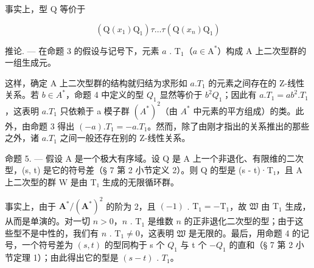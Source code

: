   事实上，型 Q 等价于

\[
(\mathrm{Q} (x _ {1}) \mathrm{Q} _ {1}) \tau \dots \tau (\mathrm{Q} (x _ {n}) \mathrm{Q} _ {1})
\]

推论. --- 在命题 3 的假设与记号下，元素 \(a\) . \(\mathrm{T}_{1}\)（\(a \in \mathrm{A}^{*}\)）构成 A 上二次型群的一组生成元。

  这样，确定 A 上二次型群的结构就归结为求形如 \(a.T_{1}\) 的元素之间存在的 Z-线性关系。若 \(b \in A^{*}\)，命题 4 中定义的型 \(Q_{1}\) 显然等价于 \(b^{2}Q_{1}\)；因此有 \(a.T_{1} = ab^{2}.T_{1}\)，这表明 \(a.T_{1}\) 只依赖于 a 模子群 \((A^{*})^{2}\)（由 \(A^{*}\) 中元素的平方组成）的类。此外，由命题 3 得出 \((-a).T_{1} = -a.T_{1}\)。然而，除了由刚才指出的关系推出的那些之外，诸 \(a.T_{1}\) 之间一般还存在别的 Z-线性关系。

命题 5. --- 假设 A 是一个极大有序域。设 Q 是 A 上一个非退化、有限维的二次型，(s, t) 是它的符号差（§ 7 第 2 小节定义 2）。则 Q 的型是 (s - t)·T₁，且 A 上二次型的群 W 是由 T₁ 生成的无限循环群。

  事实上，由于 \(\mathbf{A}^{*}/(\mathbf{A}^{*})^{2}\) 的阶为 2，且 \((-1)\) . \(\mathrm{T}_{1} = -\mathrm{T}_{1}\)，故 \(\mathfrak{W}\) 由 \(\mathrm{T}_{1}\) 生成，从而是单演的。对一切 \(n > 0\)，\(n\) . \(\mathrm{T}_{1}\) 是维数 \(n\) 的正非退化二次型的型；由于这些型不是中性的，我们有 \(n\) . \(\mathrm{T}_{1} \neq 0\)，这表明 \(\mathfrak{W}\) 是无限的。最后，用命题 4 的记号，一个符号差为 \((s, t)\) 的型同构于 s 个 \(Q_{1}\) 与 t 个 \(-Q_{1}\) 的直和（§ 7 第 2 小节定理 1）；由此得出它的型是 \((s - t)\) . \(T_{1}\)。

